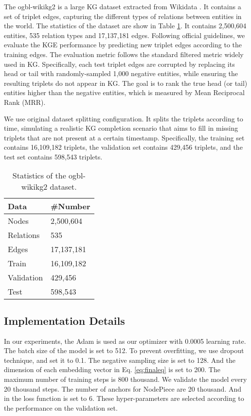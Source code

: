 \documentclass[11pt]{article}
\begin{document}
The ogbl-wikikg2 \cite{hu2020ogb} is a large KG dataset extracted from Wikidata \cite{vrandevcic2014wikidata}.
It contains a set of triplet edges, capturing the different types of relations between entities in the world. 
The statistics of the dataset are show in Table \ref{dataset}. It contains 2,500,604 entities, 535 relation types and 17,137,181 edges. Following official guidelines, we evaluate the KGE performance by predicting new triplet edges according to the training edges. The evaluation metric follows the standard filtered metric widely used in KG. 
Specifically, each test triplet edges are corrupted by replacing its head or tail with randomly-sampled 1,000 negative entities, while ensuring the resulting triplets do not appear in KG. The goal is to rank the true head (or tail) entities higher than the negative entities, which is measured by Mean Reciprocal Rank (MRR).

We use original dataset splitting configuration. It splits the triplets according to time, simulating a realistic KG completion scenario that aims to fill in missing triplets that are not present at a certain timestamp. Specifically, the training set contains 16,109,182 triplets, the validation set contains 429,456 triplets, and the test set contains 598,543 triplets.

\begin{table}[!tp]
\begin{center}
\begin{tabular}{ll}
\toprule
Data & \#Number \\
\midrule
Nodes & 2,500,604 \\
Relations & 535 \\
Edges & 17,137,181 \\
\midrule
Train & 16,109,182 \\
Validation & 429,456 \\
Test & 598,543 \\
\bottomrule
\end{tabular}
\end{center}
\caption{Statistics of the ogbl-wikikg2 dataset.}\label{dataset}
\end{table}

\subsection{Implementation Details}
In our experiments, the Adam \cite{kingma2014adam} is used as our optimizer with 0.0005 learning rate. The batch size of the model is set to 512. To prevent overfitting, we use dropout technique, and set it to 0.1. The negative sampling size  is set to 128. And the dimension of each embedding vector in Eq. \ref{eq:finaleq} is set to 200. The maximum number of training steps is 800 thousand. We validate the model every 20 thousand steps. The number of anchors for NodePiece are 20 thousand. And  in the loss function is set to 6. These hyper-parameters are selected according to the performance on the validation set.
\end{document}
